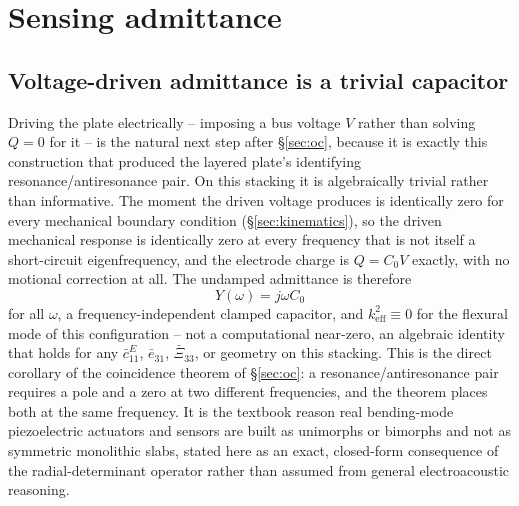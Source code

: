 \documentclass[11pt]{article}
\newcommand{\eebar}{\bar{e}_{31}}
\newcommand{\Xibar}{\bar{\Xi}_{33}}
\newcommand{\cbar}{\bar{c}_{11}^{E}}
\begin{document}
\section{Sensing admittance}\label{sec:Y}
\subsection{Voltage-driven admittance is a trivial capacitor}
\label{sec:Y-trivial}
Driving the plate electrically -- imposing a bus voltage $V$ rather than
solving $Q=0$ for it -- is the natural next step after \S\ref{sec:oc},
because it is exactly this construction that produced the layered
plate's identifying resonance/antiresonance pair. On this stacking it is
algebraically trivial rather than informative. The moment the driven
voltage produces is identically zero for every mechanical boundary
condition (\S\ref{sec:kinematics}), so the driven mechanical response is
identically zero at every frequency that is not itself a short-circuit
eigenfrequency, and the electrode charge is $Q=C_0V$ exactly, with no
motional correction at all. The undamped admittance is therefore
\begin{equation}
Y(\omega)=j\omega C_0
\label{eq:Ytrivial}
\end{equation}
for all $\omega$, a frequency-independent clamped capacitor, and
$k_{\mathrm{eff}}^2\equiv0$ for the flexural mode of this configuration
-- not a computational near-zero, an algebraic identity that holds for
any $\cbar$, $\eebar$, $\Xibar$, or geometry on this stacking. This is
the direct corollary of the coincidence theorem of \S\ref{sec:oc}: a
resonance/antiresonance pair requires a pole and a zero at two different
frequencies, and the theorem places both at the same frequency. It is
the textbook reason real bending-mode piezoelectric actuators and
sensors are built as unimorphs or bimorphs and not as symmetric
monolithic slabs, stated here as an exact, closed-form consequence of the
radial-determinant operator rather than assumed from general
electroacoustic reasoning.
\end{document}
